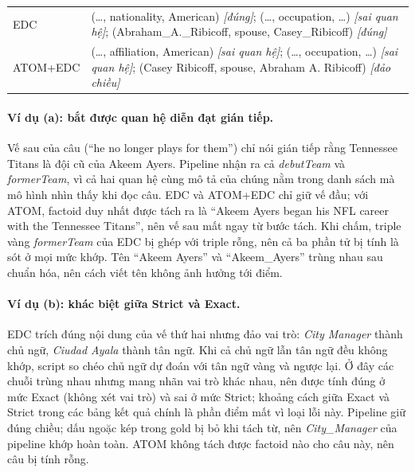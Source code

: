 \begin{table}[htbp]
\begin{tabular}{>{\raggedright\arraybackslash}p{2.0cm} >{\raggedright\arraybackslash}p{13.0cm}}
EDC & (\ldots, nationality, American) \textit{[đúng]}; (\ldots, occupation, \ldots) \textit{[sai quan hệ]}; (Abraham\_A.\_Ribicoff, spouse, Casey\_Ribicoff) \textit{[đúng]} \\
ATOM+EDC & (\ldots, affiliation, American) \textit{[sai quan hệ]}; (\ldots, occupation, \ldots) \textit{[sai quan hệ]}; (Casey Ribicoff, spouse, Abraham A. Ribicoff) \textit{[đảo chiều]} \\
\bottomrule
\end{tabular}
\end{table}

\paragraph*{Ví dụ (a): bắt được quan hệ diễn đạt gián tiếp.}
Vế sau của câu (``he no longer plays for them'') chỉ nói gián tiếp rằng Tennessee Titans là đội cũ của Akeem Ayers.
Pipeline nhận ra cả \textit{debutTeam} và \textit{formerTeam}, vì cả hai quan hệ cùng mô tả của chúng nằm trong danh sách mà mô hình nhìn thấy khi đọc câu.
EDC và ATOM+EDC chỉ giữ vế đầu; với ATOM, factoid duy nhất được tách ra là ``Akeem Ayers began his NFL career with the Tennessee Titans'', nên vế sau mất ngay từ bước tách.
Khi chấm, triple vàng \textit{formerTeam} của EDC bị ghép với triple rỗng, nên cả ba phần tử bị tính là sót ở mọi mức khớp.
Tên ``Akeem Ayers'' và ``Akeem\_Ayers'' trùng nhau sau chuẩn hóa, nên cách viết tên không ảnh hưởng tới điểm.

\paragraph*{Ví dụ (b): khác biệt giữa Strict và Exact.}
EDC trích đúng nội dung của vế thứ hai nhưng đảo vai trò: \textit{City Manager} thành chủ ngữ, \textit{Ciudad Ayala} thành tân ngữ. Khi cả chủ ngữ lẫn tân ngữ đều không khớp, script so chéo chủ ngữ dự đoán với tân ngữ vàng và ngược lại.
Ở đây các chuỗi trùng nhau nhưng mang nhãn vai trò khác nhau, nên được tính đúng ở mức Exact (không xét vai trò) và sai ở mức Strict; khoảng cách giữa Exact và Strict trong các bảng kết quả chính là phần điểm mất vì loại lỗi này.
Pipeline giữ đúng chiều; dấu ngoặc kép trong gold bị bỏ khi tách từ, nên \textit{City\_Manager} của pipeline khớp hoàn toàn. ATOM không tách được factoid nào cho câu này, nên câu bị tính rỗng.

